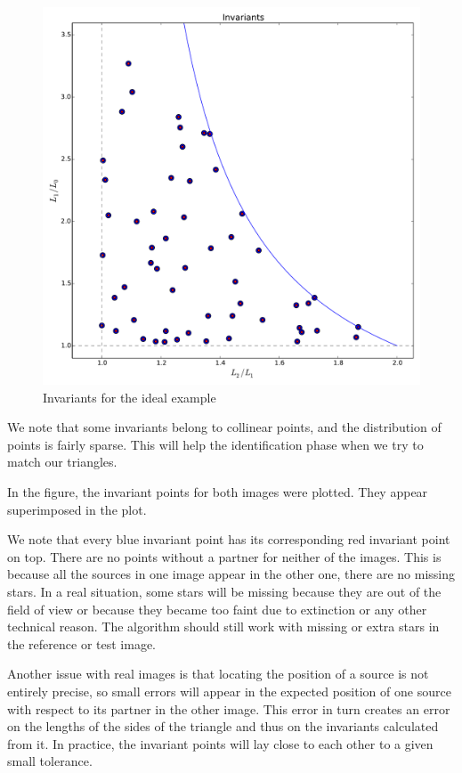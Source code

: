 \begin{figure}
   \centering
   \includegraphics[width = \linewidth]{chapter_astroalign/figures/idealInvariants.pdf}
   \caption{Invariants for the ideal example}
   \label{fig:ideal_inv}
\end{figure}

We note that some invariants belong to collinear points, and the distribution of points is fairly sparse. 
This will help the identification phase when we try to match our triangles.

In the figure, the invariant points for both images were plotted. They appear superimposed in the plot.

We note that every blue invariant point has its corresponding red invariant point on top. 
There are no points without a partner for neither of the images. 
This is because all the sources in one image appear in the other one, there are no missing stars.
In a real situation, some stars will be missing because they are out of the field of view or because they became too faint due to extinction or any other technical reason. 
The algorithm should still work with missing or extra stars in the reference or test image. 

Another issue with real images is that locating the position of a source is not entirely precise, so small errors will appear in the expected position of one source with respect to its partner in the other image.
This error in turn creates an error on the lengths of the sides of the triangle and thus on the invariants calculated from it.
In practice, the invariant points will lay close to each other to a given small tolerance.

